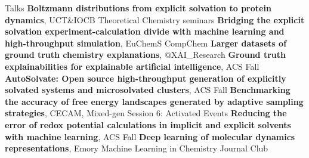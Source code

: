 \begin{rubric}{Talks}
\entry*[\hspace{1.05cm}2023] \textbf{Boltzmann distributions from explicit solvation to protein dynamics}, UCT\&IOCB Theoretical Chemistry seminars
\entry*[\hspace{1.05cm}2023] \textbf{Bridging the explicit solvation experiment-calculation divide with machine learning and high-throughput simulation}, EuChemS CompChem
\entry*[\hspace{1.05cm}2023] \textbf{Larger datasets of ground truth chemistry explanations}, $@$XAI\_Research
\entry*[\hspace{1.05cm}2022] \textbf{Ground truth explainabilities for explainable artificial intelligence}, ACS Fall
\entry*[\hspace{1.05cm}2022] \textbf{AutoSolvate: Open source high-throughput generation of explicitly solvated systems and microsolvated clusters}, ACS Fall
\entry*[\hspace{1.05cm}2021] \textbf{Benchmarking the accuracy of free energy landscapes generated by adaptive sampling strategies}, CECAM, Mixed-gen Session 6: Activated Events
\entry*[\hspace{1.05cm}2021] \textbf{Reducing the error of redox potential calculations in implicit and explicit solvents with machine learning}, ACS Fall
\entry*[\hspace{1.05cm}2020] \textbf{Deep learning of molecular dynamics representations}, Emory Machine Learning in Chemistry Journal Club
\end{rubric}


